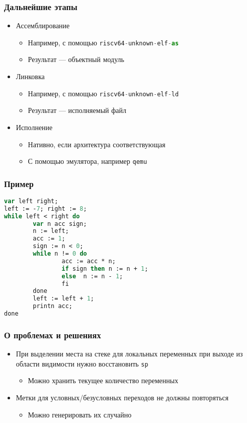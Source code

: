 \documentclass{beamer}
\begin{document}
\begin{frame}
	\frametitle{Дальнейшие этапы}
	\begin{itemize}
		\item Ассемблирование
		\begin{itemize}
			\item Например, с помощью \lstinline[language=Python]|riscv64-unknown-elf-as|
			\item Результат — объектный модуль
		\end{itemize}
		\item Линковка
			\begin{itemize}
				\item Например, с помощью \lstinline[language=Python]|riscv64-unknown-elf-ld|
				\item Результат — исполняемый файл
			\end{itemize}
		\item Исполнение
		\begin{itemize}
			\item Нативно, если архитектура соответствующая
			\item С помощью эмулятора, например \lstinline[language=Python]|qemu|
		\end{itemize}
	\end{itemize}
\end{frame}

\begin{frame}[fragile]
	\frametitle{Пример}
	\begin{itemize}
		\begin{lstlisting}[language=PASCAL]
var left right;
left := -7; right := 8;
while left < right do
		var n acc sign;
		n := left;
		acc := 1;
		sign := n < 0;
		while n != 0 do
				acc := acc * n;  
				if sign then n := n + 1;
				else  n := n - 1;
				fi
		done
		left := left + 1;
		printn acc;
done
		\end{lstlisting}
	\end{itemize}
\end{frame}

\begin{frame}
	\frametitle{О проблемах и решениях}
	\begin{itemize}
		\item При выделении места на стеке для локальных переменных при выходе из области видимости нужно восстановить \lstinline[language=Python]|sp|
		\begin{itemize}		
			\item Можно хранить текущее количество переменных
		\end{itemize}
		\item Метки для условных/безусловных переходов не должны повторяться
		\begin{itemize}		
			\item Можно генерировать их случайно
		\end{itemize}
	\end{itemize}
\end{frame}
\end{document}
